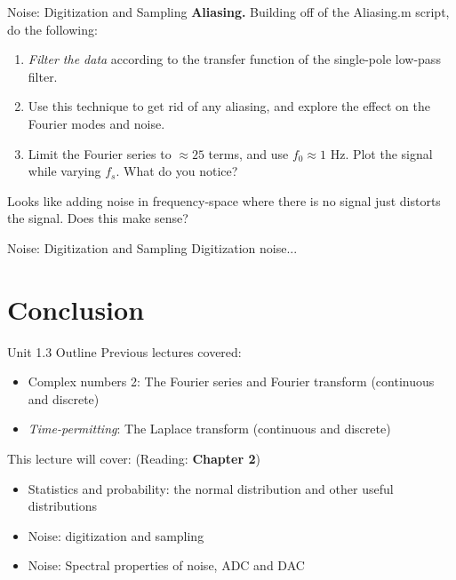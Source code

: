 \documentclass{beamer}
\begin{document}
\begin{frame}{Noise: Digitization and Sampling}
\small
\textbf{Aliasing.} Building off of the Aliasing.m script, do the following:
\begin{enumerate}
\item \textit{Filter the data} according to the transfer function of the single-pole low-pass filter.
\item Use this technique to get rid of any aliasing, and explore the effect on the Fourier modes and noise.
\item Limit the Fourier series to $\approx 25$ terms, and use $f_0 \approx 1$ Hz.  Plot the signal while varying $f_{s}$.  What do you notice?
\end{enumerate}
Looks like adding noise in frequency-space where there is no signal just distorts the signal.  Does this make sense?
\end{frame}

\begin{frame}{Noise: Digitization and Sampling}
Digitization noise...
\end{frame}

\section{Conclusion}

\begin{frame}{Unit 1.3 Outline}
Previous lectures covered:
\begin{itemize}
\item Complex numbers 2: The Fourier series and Fourier transform (continuous and discrete)
\item \textit{Time-permitting}: The Laplace transform (continuous and discrete)
\end{itemize}
This lecture will cover: (Reading: \textbf{Chapter 2})
\begin{itemize}
\item \alert{Statistics and probability: the normal distribution and other useful distributions}
\item \alert{Noise: digitization and sampling}
\item Noise: Spectral properties of noise, ADC and DAC
\end{itemize}
\end{frame}
\end{document}
